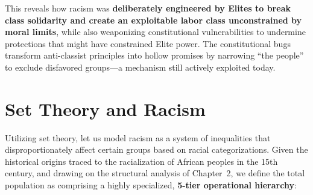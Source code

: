 \documentclass[12pt,openany]{book}
\begin{document}
This reveals how racism was \textbf{deliberately engineered by Elites to break class solidarity and create an exploitable labor class unconstrained by moral limits}, while also weaponizing constitutional vulnerabilities to undermine protections that might have constrained Elite power. The constitutional bugs transform anti-classist principles into hollow promises by narrowing ``the people'' to exclude disfavored groups---a mechanism still actively exploited today.

\chapter{Set Theory and Racism}

Utilizing set theory, let us model racism as a system of inequalities that disproportionately affect certain groups based on racial categorizations. Given the historical origins traced to the racialization of African peoples in the 15th century, and drawing on the structural analysis of Chapter~2, we define the total population as comprising a highly specialized, \textbf{5-tier operational hierarchy}:
\end{document}
